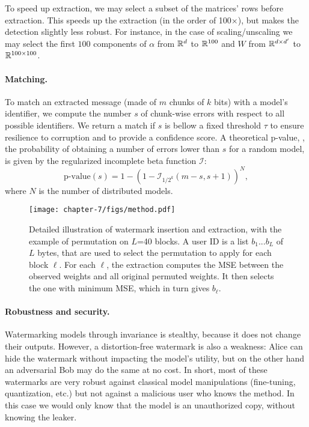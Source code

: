 To speed up extraction, we may select a subset of the matrices' rows before extraction.
This speeds up the extraction (in the order of 100$\times$), but makes the detection slightly less robust. 
For instance, in the case of scaling/unscaling we may select the first $100$ components of $\alpha$ from $\mathbb{R}^{d}$ to $\mathbb{R}^{100}$ and $W$ from $\mathbb{R}^{d\times d'}$ to $\mathbb{R}^{100\times 100}$.  

\paragraph*{Matching.}
To match an extracted message (made of $m$ chunks of $k$ bits) with a model's identifier, we compute the number $s$ of chunk-wise errors with respect to all possible identifiers.
We return a match if $s$ is bellow a fixed threshold $\tau$ to ensure resilience to corruption and to provide a confidence score.
A theoretical p-value, \ie, the probability of obtaining a number of errors lower than $s$ for a random model, is given by the regularized incomplete beta function $\mathcal{I}$:
\begin{equation}\label{chap7/eq:pvalue}
    \textrm{p-value}(s) = 1- \left(1-\mathcal{I}_{ 1/2^{k} } ( m-s, s+1) \right)^N,
\end{equation}
where $N$ is the number of distributed models. 


\begin{figure}[b!]
    \centering
    \texttt{[image: chapter-7/figs/method.pdf]}
    \caption{
    Detailed illustration of watermark insertion and extraction, with the example of permutation on $L$=40 blocks. 
    A user ID is a list $b_1...b_L$ of $L$ bytes, that are used to select the permutation to apply for each block $\ell$.
    For each $\ell$, the extraction computes the MSE between the observed weights and all original permuted weights. 
    It then selects the one with minimum MSE, which in turn gives $b_\ell$.
    }
    \label{chap7/fig:method}
\end{figure}


\paragraph*{Robustness and security.}
Watermarking models through invariance is stealthy, because it does not change their outputs.
However, a distortion-free watermark is also a weakness: Alice can hide the watermark without impacting the model's utility, but on the other hand an adversarial Bob may do the same at no cost.
In short, most of these watermarks are very robust against classical model manipulations (fine-tuning, quantization, etc.) but not against a malicious user who knows the method.
In this case we would only know that the model is an unauthorized copy, without knowing the leaker.

